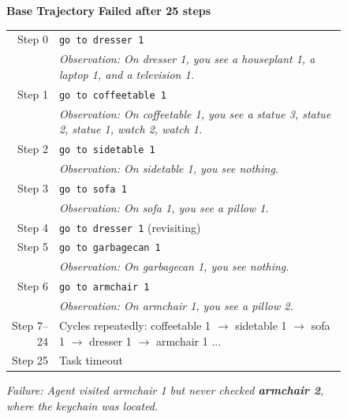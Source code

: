 \begin{figure}[thb]
\centering

\begin{tcolorbox}[
    colback=white,
    colframe=black!70,
    title=\textbf{ALFWorld: Put a keychain in dresser},
    fonttitle=\bfseries\small,
    width=\textwidth,
    boxrule=0.5pt
]

\textbf{Base Trajectory} \hfill \textcolor{red!70!black}{\textbf{Failed after 25 steps}}

\vspace{0.5em}
\footnotesize
\begin{tabular}{@{}r@{\hspace{0.8em}}p{13cm}@{}}
Step 0 & \texttt{go to dresser 1} \\
       & \textit{Observation: On dresser 1, you see a houseplant 1, a laptop 1, and a television 1.} \\[0.3em]
Step 1 & \texttt{go to coffeetable 1} \\
       & \textit{Observation: On coffeetable 1, you see a statue 3, statue 2, statue 1, watch 2, watch 1.} \\[0.3em]
Step 2 & \texttt{go to sidetable 1} \\
       & \textit{Observation: On sidetable 1, you see nothing.} \\[0.3em]
Step 3 & \texttt{go to sofa 1} \\
       & \textit{Observation: On sofa 1, you see a pillow 1.} \\[0.3em]
Step 4 & \texttt{go to dresser 1} \quad (revisiting) \\[0.3em]
Step 5 & \texttt{go to garbagecan 1} \\
       & \textit{Observation: On garbagecan 1, you see nothing.} \\[0.3em]
Step 6 & \texttt{go to armchair 1} \\
       & \textit{Observation: On armchair 1, you see a pillow 2.} \\[0.3em]
Step 7--24 & Cycles repeatedly: coffeetable 1 $\rightarrow$ sidetable 1 $\rightarrow$ sofa 1 $\rightarrow$ dresser 1 $\rightarrow$ armchair 1 ... \\[0.3em]
Step 25 & Task timeout \\
\end{tabular}

\vspace{0.3em}
\textit{Failure: Agent visited armchair 1 but never checked \textbf{armchair 2}, where the keychain was located.}


\end{tcolorbox}
\end{figure}
